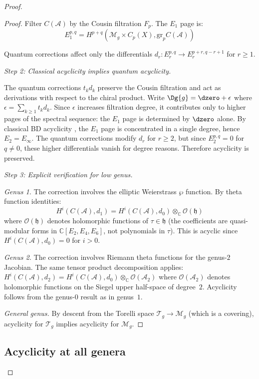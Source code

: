 \begin{proof}
\begin{proof}
Filter $C(\mathcal{A})$ by the Cousin filtration $F_p$. The $E_1$ page is:
\[E_1^{p,q} = H^{p+q}(\mathcal{M}_g \times C_p(X), \text{gr}_p C(\mathcal{A}))\]

Quantum corrections affect only the differentials $d_r: E_r^{p,q} \to E_r^{p+r, q-r+1}$ for $r \geq 1$.

\emph{Step 2: Classical acyclicity implies quantum acyclicity.}

The quantum corrections $t_k d_k$ preserve the Cousin filtration and act as derivations with respect to the chiral product. Write $\Dg{g} = \dzero + \epsilon$ where $\epsilon = \sum_{k \geq 1} t_k d_k$. Since $\epsilon$ increases filtration degree, it contributes only to higher pages of the spectral sequence: the $E_1$ page is determined by $\dzero$ alone. By classical BD acyclicity \cite[Theorem~3.4.12]{BD04}, the $E_1$ page is concentrated in a single degree, hence $E_2 = E_\infty$. The quantum corrections modify $d_r$ for $r \geq 2$, but since $E_2^{p,q} = 0$ for $q \neq 0$, these higher differentials vanish for degree reasons. Therefore acyclicity is preserved.

\emph{Step 3: Explicit verification for low genus.}

\emph{Genus 1.} The correction involves the elliptic Weierstrass $\wp$ function. By theta function identities:
\[H^i(C(\mathcal{A}), d_1) = H^i(C(\mathcal{A}), d_0) \otimes_\mathbb{C} \mathcal{O}(\mathfrak{h})\]
where $\mathcal{O}(\mathfrak{h})$ denotes holomorphic functions of $\tau \in \mathfrak{h}$ (the coefficients are quasi-modular forms in $\mathbb{C}[E_2, E_4, E_6]$, not polynomials in $\tau$). This is acyclic since $H^i(C(\mathcal{A}), d_0) = 0$ for $i > 0$.

\emph{Genus 2.} The correction involves Riemann theta functions for the genus-$2$ Jacobian. The same tensor product decomposition applies: $H^i(C(\mathcal{A}), d_2) = H^i(C(\mathcal{A}), d_0) \otimes_\mathbb{C} \mathcal{O}(\mathcal{A}_2)$ where $\mathcal{O}(\mathcal{A}_2)$ denotes holomorphic functions on the Siegel upper half-space of degree~$2$. Acyclicity follows from the genus-$0$ result as in genus~$1$.

\emph{General genus.} By descent from the Torelli space $\mathcal{T}_g \to \mathcal{M}_g$ (which is a covering), acyclicity for $\mathcal{T}_g$ implies acyclicity for $\mathcal{M}_g$.
\end{proof}

\subsection*{Acyclicity at all genera}


\end{proof}
